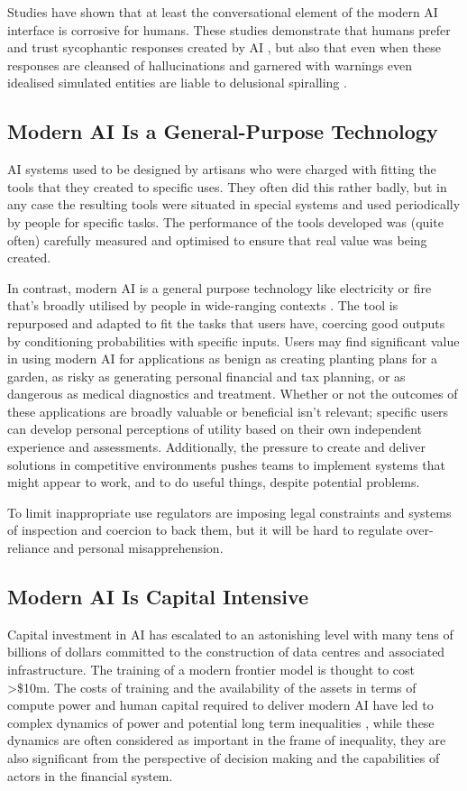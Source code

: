 \documentclass[11pt]{article}
\begin{document}
Studies have shown that at least the conversational element of the modern AI interface is corrosive for humans. These studies demonstrate that humans prefer and trust sycophantic responses created by AI \cite{cheng_sycophantic_2026}, but also that even when these responses are cleansed of hallucinations and garnered with warnings even idealised simulated entities are liable to delusional spiralling \cite{chandra_sycophantic_2026}.


\subsection{Modern AI Is a General-Purpose Technology}
AI systems used to be designed by artisans who were charged with fitting the tools that they created to specific uses. They often did this rather badly, but in any case the resulting tools were situated in special systems and used periodically by people for specific tasks. The performance of the tools developed was (quite often) carefully measured and optimised to ensure that real value was being created. 

In contrast, modern AI is a general purpose technology like electricity or fire that's broadly utilised by people in wide-ranging contexts \citep{mcafee_economic_nodate}. The tool is repurposed and adapted to fit the tasks that users have, coercing good outputs by conditioning probabilities with specific inputs. Users may find significant value in using modern AI for applications as benign as creating planting plans for a garden, as risky as generating personal financial and tax planning, or as dangerous as medical diagnostics and treatment. Whether or not the outcomes of these applications are broadly valuable or beneficial isn't relevant; specific users can develop personal perceptions of utility based on their own independent experience and assessments. Additionally, the pressure to create and deliver solutions in competitive environments pushes teams to implement systems that might appear to work, and to do useful things, despite potential problems. 

To limit inappropriate use regulators are imposing legal constraints and systems of inspection and coercion to back them, but it will be hard to regulate over-reliance and personal misapprehension.

\subsection{Modern AI Is Capital Intensive}
Capital investment in AI has escalated to an astonishing level with many tens of billions of dollars committed to the construction of data centres and associated infrastructure. The training of a modern frontier model is thought to cost \textgreater{}\$10m. The costs of training and the availability of the assets in terms of compute power and human capital required to deliver modern AI have led to complex dynamics of power \citep{longpre_economies_2025} and potential long term inequalities \citep{lehdonvirta_compute_2024}, while these dynamics are often considered as important in the frame of inequality, they are also significant from the perspective of decision making and the capabilities of actors in the financial system. 
\end{document}
